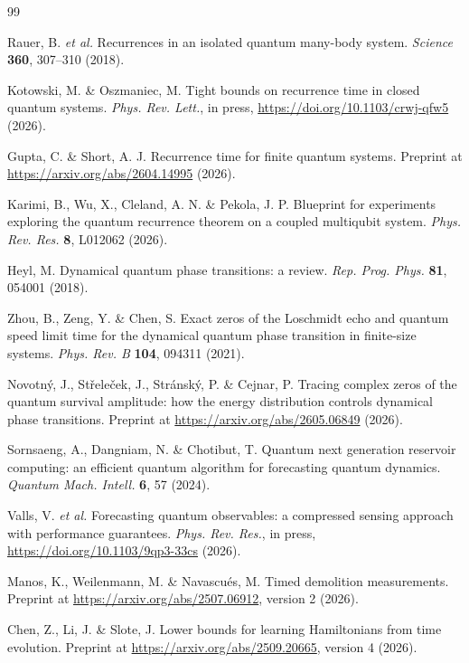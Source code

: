 \documentclass[12pt]{article}
\begin{document}
\begin{thebibliography}{99}

Rauer, B. \textit{et al.} Recurrences in an isolated quantum many-body
system. \textit{Science} \textbf{360}, 307--310 (2018).

Kotowski, M. \& Oszmaniec, M. Tight bounds on recurrence time in closed
quantum systems. \textit{Phys. Rev. Lett.}, in press,
\url{https://doi.org/10.1103/crwj-qfw5} (2026).

Gupta, C. \& Short, A. J. Recurrence time for finite quantum systems.
Preprint at \url{https://arxiv.org/abs/2604.14995} (2026).

Karimi, B., Wu, X., Cleland, A. N. \& Pekola, J. P. Blueprint for
experiments exploring the quantum recurrence theorem on a coupled
multiqubit system. \textit{Phys. Rev. Res.} \textbf{8}, L012062 (2026).

Heyl, M. Dynamical quantum phase transitions: a review.
\textit{Rep. Prog. Phys.} \textbf{81}, 054001 (2018).

Zhou, B., Zeng, Y. \& Chen, S. Exact zeros of the Loschmidt echo and
quantum speed limit time for the dynamical quantum phase transition in
finite-size systems. \textit{Phys. Rev. B} \textbf{104}, 094311 (2021).

Novotn\'y, J., St\v{r}ele\v{c}ek, J., Str\'ansk\'y, P. \& Cejnar, P.
Tracing complex zeros of the quantum survival amplitude: how the energy
distribution controls dynamical phase transitions. Preprint at
\url{https://arxiv.org/abs/2605.06849} (2026).

Sornsaeng, A., Dangniam, N. \& Chotibut, T. Quantum next generation
reservoir computing: an efficient quantum algorithm for forecasting quantum
dynamics. \textit{Quantum Mach. Intell.} \textbf{6}, 57 (2024).

Valls, V. \textit{et al.} Forecasting quantum observables: a compressed
sensing approach with performance guarantees. \textit{Phys. Rev. Res.},
in press, \url{https://doi.org/10.1103/9qp3-33cs} (2026).

Manos, K., Weilenmann, M. \& Navascu\'es, M. Timed demolition
measurements. Preprint at \url{https://arxiv.org/abs/2507.06912},
version 2 (2026).

Chen, Z., Li, J. \& Slote, J. Lower bounds for learning Hamiltonians from
time evolution. Preprint at \url{https://arxiv.org/abs/2509.20665},
version 4 (2026).


\end{thebibliography}
\end{document}
